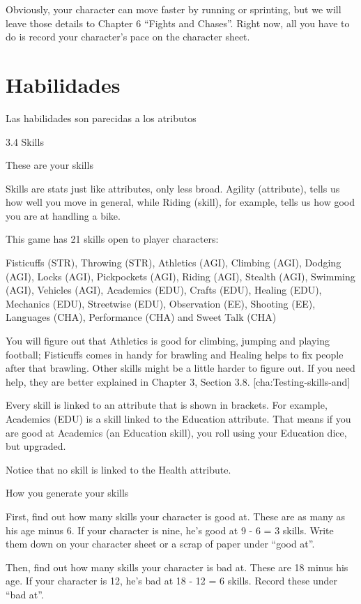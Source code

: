 Obviously, your character can move faster by running or sprinting, but we will leave those details to Chapter 6 “Fights and Chases”. Right now, all you have to do is record your character's pace on the character sheet.

\section{Habilidades}

Las habilidades son parecidas a los atributos

3.4 Skills

These are your skills

Skills are stats just like attributes, only less broad. Agility (attribute), tells us how well you move in general, while Riding (skill), for example, tells us how good you are at handling a bike.

This game has 21 skills open to player characters:

Fisticuffs (STR), Throwing (STR), Athletics (AGI), Climbing (AGI), Dodging (AGI), Locks (AGI), Pickpockets (AGI), Riding (AGI), Stealth (AGI), Swimming (AGI), Vehicles (AGI), Academics (EDU), Crafts (EDU), Healing (EDU), Mechanics (EDU), Streetwise (EDU), Observation (EE), Shooting (EE), Languages (CHA), Performance (CHA) and Sweet Talk (CHA) 

You will figure out that Athletics is good for climbing, jumping and playing football; Fisticuffs comes in handy for brawling and Healing helps to fix people after that brawling. Other skills might be a little harder to figure out. If you need help, they are better explained in Chapter 3, Section 3.8. [cha:Testing-skills-and]

Every skill is linked to an attribute that is shown in brackets. For example, Academics (EDU) is a skill linked to the Education attribute. That means if you are good at Academics (an Education skill), you roll using your Education dice, but upgraded.

Notice that no skill is linked to the Health attribute.

How you generate your skills

First, find out how many skills your character is good at. These are as many as his age minus 6. If your character is nine, he's good at 9 - 6 = 3 skills. Write them down on your character sheet or a scrap of paper under “good at”.

Then, find out how many skills your character is bad at. These are 18 minus his age. If your character is 12, he's bad at 18 - 12 = 6 skills. Record these under “bad at”.

